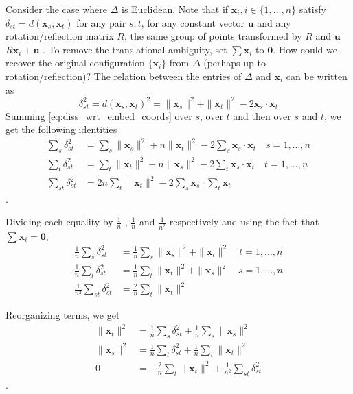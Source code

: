 \documentclass[12pt,oneside,final]{thesis}
\begin{document}
Consider the case where $\Delta$ is Euclidean. Note that if $\bm{x}_{i},i \in \{1,\ldots,n\} $ satisfy $\delta_{st}=d(\bm{x}_{s},\bm{x}_{t})$ for any pair $s,t$, for any constant vector $\bm{u}$ and any rotation/reflection matrix $R$, the same group  of points transformed by $R$ and   $\bm{u}$ $R\bm{x}_{i}+\bm{u}$ . To remove the translational ambiguity, set   $\sum{\bm{x}_{i}}$  to $\bm{0}$. How could we recover the original configuration   $\{\bm{x}_{i}\}$ from $\Delta$ (perhaps up to rotation/reflection)?
The relation between the entries of $\Delta$ and $\bm{x}_{i}$ can be written as
\[
\delta_{st}^2= d(\bm{x}_{s},\bm{x}_{t})^2 = \|\bm{x}_{s}   \|^2 +   \|\bm{x}_{t}   \|^2   -   2  \bm{x}_{s} \cdot  \bm{x}_{t}   
\label{eq:diss_wrt_embed_coords}
\]
Summing \eqref{eq:diss_wrt_embed_coords} over $s$, over $t$ and then over $s$ and $t$, we get the following identities
\begin{align}
\label{eq:diss_wrt_embed_coords_2_1}
\sum_s{ \delta_{st}^2} &= \sum_s{\| \bm{x}_{s}   \|^2} + n \|\bm{x}_{t}   \|^2 -2 \sum_s{ \bm{x}_{s}   \cdot\bm{x}_{t}    } \quad s=1,\ldots,n\\
\label{eq:diss_wrt_embed_coords_2_2}
\sum_t{ \delta_{st}^2} &= \sum_t{\| \bm{x}_{t}   \|^2} + n\|\bm{x}_{s}   \|^2  -2 \sum_t{ \bm{x}_{s}   \cdot\bm{x}_{t}   } \quad t=1,\ldots,n \\
\label{eq:diss_wrt_embed_coords_2_3}
\sum_{st}{ \delta_{st}^2} &= 2n\sum_{t}{\| \bm{x}_{t}   \|^2}  -2\sum_{s}{ \bm{x}_{s} } \cdot \sum_t{   \bm{x}_{t} }
\end{align}
.

Dividing each equality by $\frac{1}{n}$ , $\frac{1}{n}$ and $\frac{1}{n^2}$ respectively and using the fact that $\sum{\bm{x}_{i}}=\bm{0}$,
\begin{align}
\label{eq:diss_wrt_embed_coords_3_1}
\frac{1}{n}\sum_s{ \delta_{st}^2} &= \frac{1}{n}\sum_s{\|\bm{x}_{s}   \|^2 } +  \|\bm{x}_{t}   \|^2 \quad   t=1,\ldots,n\\
\label{eq:diss_wrt_embed_coords_3_2}
\frac{1}{n}\sum_t{ \delta_{st}^2} &= \frac{1}{n}\sum_t{\|\bm{x}_{t}   \|^2 }+  \|\bm{x}_{s}   \|^2 \quad   s=1,\ldots,n\\
\label{eq:diss_wrt_embed_coords_3_3}
\frac{1}{n^2}\sum_{st}{ \delta_{st}^2} &= \frac{2}{n}\sum_{t}{\|\bm{x}_{t}   \|^2} 
\end{align}

Reorganizing terms, we get
\begin{align}
\label{eq:diss_wrt_embed_coords_4_1}
\|\bm{x}_{t}   \|^2  &= \frac{1}{n}\sum_s{ \delta_{st}^2} + \frac{1}{n}\sum_s{\|\bm{x}_{s}   \|^2   } \\
\label{eq:diss_wrt_embed_coords_4_2}
\|\bm{x}_{s}   \|^2  &= \frac{1}{n}\sum_t{ \delta_{st}^2} + \frac{1}{n}\sum_t{\|\bm{x}_{t}   \|^2  }\\
\label{eq:diss_wrt_embed_coords_4_3}
0 &= -\frac{2}{n}\sum_{t}{\|\bm{x}_{t}   \|^2} +\frac{1}{n^2}\sum_{st}{ \delta_{st}^2} 
\end{align} .
\end{document}
